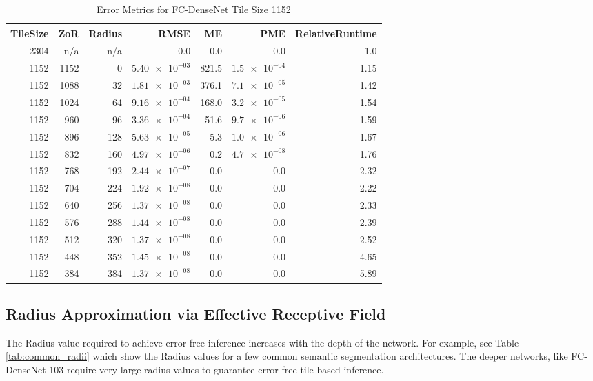 \documentclass[runningheads]{llncs}
\begin{document}
\begin{table}[h!]
	\centering
	\caption{Error Metrics for FC-DenseNet Tile Size 1152}
	\label{tab:tile_size_1152}
	\begin{tabular}{r|r|r|r|r|r|r}
		TileSize & ZoR & Radius & RMSE    & ME & PME & RelativeRuntime \\ 
		\hline
2304 & n/a & n/a & 0.0 & 0.0 & 0.0 & 1.0 \\
1152 & 1152 & 0 & $\num{5.40e-03}$ & 821.5 & $\num{1.5e-04}$ & 1.15 \\
1152 & 1088 & 32 & $\num{1.81e-03}$ & 376.1 & $\num{7.1e-05}$ & 1.42 \\
1152 & 1024 & 64 & $\num{9.16e-04}$ & 168.0 & $\num{3.2e-05}$ & 1.54 \\
1152 & 960 & 96 & $\num{3.36e-04}$ & 51.6 & $\num{9.7e-06}$ & 1.59 \\
1152 & 896 & 128 & $\num{5.63e-05}$ & 5.3 & $\num{1.0e-06}$ & 1.67 \\
1152 & 832 & 160 & $\num{4.97e-06}$ & 0.2 & $\num{4.7e-08}$ & 1.76 \\
1152 & 768 & 192 & $\num{2.44e-07}$ & 0.0 & 0.0 & 2.32 \\
1152 & 704 & 224 & $\num{1.92e-08}$ & 0.0 & 0.0 & 2.22 \\
1152 & 640 & 256 & $\num{1.37e-08}$ & 0.0 & 0.0 & 2.33 \\
1152 & 576 & 288 & $\num{1.44e-08}$ & 0.0 & 0.0 & 2.39 \\
1152 & 512 & 320 & $\num{1.37e-08}$ & 0.0 & 0.0 & 2.52 \\
1152 & 448 & 352 & $\num{1.45e-08}$ & 0.0 & 0.0 & 4.65 \\
1152 & 384 & 384 & $\num{1.37e-08}$ & 0.0 & 0.0 & 5.89 \\
	\end{tabular}
\end{table}


\subsection{Radius Approximation via Effective Receptive Field}

The Radius value required to achieve error free inference increases with the depth of the network. For example, see Table \ref{tab:common_radii} which show the Radius values for a few common semantic segmentation architectures. The deeper networks, like FC-DenseNet-103 require very large radius values to guarantee error free tile based inference.
\end{document}

